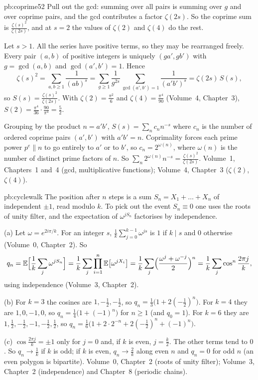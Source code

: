 \begin{solution}{pb:coprime52}
\idea Pull out the gcd: summing over all pairs is summing over $g$ and over coprime pairs, and the gcd contributes a factor
$\zeta(2s)$. So the coprime sum is $\frac{\zeta(s)^2}{\zeta(2s)}$, and at $s=2$ the values of $\zeta(2)$ and $\zeta(4)$ do the
rest.

\writeup Let $s>1$. All the series have positive terms, so they may be rearranged freely. Every pair $(a,b)$ of positive
integers is uniquely $(ga',gb')$ with $g=\gcd(a,b)$ and $\gcd(a',b')=1$. Hence
\[
\zeta(s)^2=\sum_{a,b\ge1}\frac1{(ab)^s}=\sum_{g\ge1}\frac1{g^{2s}}\sum_{\gcd(a',b')=1}\frac1{(a'b')^s}=\zeta(2s)\,S(s),
\]
so $S(s)=\frac{\zeta(s)^2}{\zeta(2s)}$. With $\zeta(2)=\frac{\pi^2}6$ and $\zeta(4)=\frac{\pi^4}{90}$ (Volume~4, Chapter~3),
$S(2)=\frac{\pi^4}{36}\cdot\frac{90}{\pi^4}=\frac52$.

Grouping by the product $n=a'b'$, $S(s)=\sum_nc_nn^{-s}$ where $c_n$ is the number of ordered coprime pairs $(a',b')$ with
$a'b'=n$. Coprimality forces each prime power $p^e\parallel n$ to go entirely to $a'$ or to $b'$, so $c_n=2^{\omega(n)}$, where
$\omega(n)$ is the number of distinct prime factors of $n$. So $\sum_n2^{\omega(n)}n^{-s}=\frac{\zeta(s)^2}{\zeta(2s)}$.
\tools Volume~1, Chapters~1 and~4 (gcd, multiplicative functions); Volume~4, Chapter~3 ($\zeta(2)$, $\zeta(4)$).
\end{solution}

\begin{solution}{pb:cyclewalk}
\idea The position after $n$ steps is a sum $S_n=X_1+\dots+X_n$ of independent $\pm1$, read modulo $k$. To pick out the event
$S_n\equiv0$ one uses the roots of unity filter, and the expectation of $\omega^{jS_n}$ factorises by independence.

\writeup (a) Let $\omega=e^{2i\pi/k}$. For an integer $s$, $\frac1k\sum_{j=0}^{k-1}\omega^{js}$ is $1$ if $k\mid s$ and $0$
otherwise (Volume~0, Chapter~2). So
\[
q_n=\mathbb E\Bigl[\frac1k\sum_j\omega^{jS_n}\Bigr]=\frac1k\sum_j\prod_{i=1}^n\mathbb E\bigl[\omega^{jX_i}\bigr]
=\frac1k\sum_j\Bigl(\frac{\omega^j+\omega^{-j}}2\Bigr)^n=\frac1k\sum_j\cos^n\frac{2\pi j}k,
\]
using independence (Volume~3, Chapter~2).

(b) For $k=3$ the cosines are $1,-\frac12,-\frac12$, so $q_n=\frac13\bigl(1+2(-\frac12)^n\bigr)$. For $k=4$ they are
$1,0,-1,0$, so $q_n=\frac14\bigl(1+(-1)^n\bigr)$ for $n\ge1$ (and $q_0=1$). For $k=6$ they are $1,\frac12,-\frac12,-1,-\frac12,
\frac12$, so $q_n=\frac16\bigl(1+2\cdot2^{-n}+2(-\frac12)^n+(-1)^n\bigr)$.

(c) $\cos\frac{2\pi j}k=\pm1$ only for $j=0$ and, if $k$ is even, $j=\frac k2$. The other terms tend to $0$. So $q_n\to\frac1k$
if $k$ is odd; if $k$ is even, $q_n\to\frac2k$ along even $n$ and $q_n=0$ for odd $n$ (an even polygon is bipartite).
\tools Volume~0, Chapter~2 (roots of unity filter); Volume~3, Chapter~2 (independence) and Chapter~8 (periodic chains).
\end{solution}

